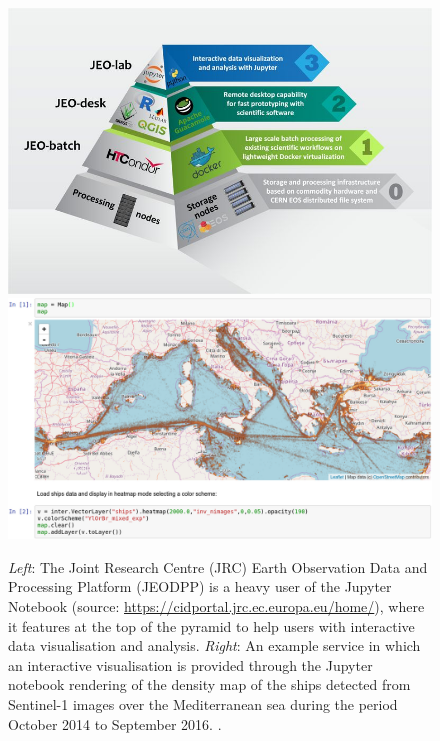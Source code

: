 \begin{figure}[tbh]
  \centering\includegraphics[height=0.2\textheight]{images/jeodpp.png}
  \centering\includegraphics[height=0.2\textheight]{images/jeodpp-demo.jpg}
  \caption{\emph{Left}: The Joint Research Centre (JRC) Earth Observation
    Data and Processing Platform (JEODPP) is a heavy user of the
    Jupyter Notebook (source:
    \url{https://cidportal.jrc.ec.europa.eu/home/}), where it features
    at the top of the pyramid to help users with interactive data
    visualisation and analysis. \emph{Right}: An example
    service in which an interactive visualisation is provided through
    the Jupyter notebook rendering of the density map of the ships
    detected from Sentinel-1 images over the Mediterranean sea during
    the period October 2014 to September 2016. \cite[Figure
    6]{Soille2018}. \label{fig:jeodpp}}
\end{figure}
